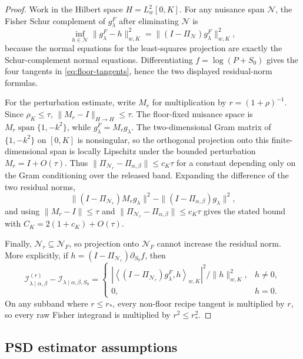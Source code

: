 \documentclass[11pt]{article}
\newcommand{\calI}{\mathcal I}
\newcommand{\calN}{\mathcal N}
\newcommand{\inner}[2]{\left\langle #1,#2\right\rangle}
\begin{document}
\begin{proof}
Work in the Hilbert space \(H=L^2_w[0,K]\). For any nuisance span \(\calN\), the Fisher Schur complement of \(g_\lambda^F\) after eliminating \(\calN\) is
\[
\inf_{h\in\calN}\|g_\lambda^F-h\|_{w,K}^2
=\|(I-\Pi_\calN)g_\lambda^F\|_{w,K}^2,
\]
because the normal equations for the least-squares projection are exactly the Schur-complement normal equations. Differentiating \(f=\log(P+S_0)\) gives the four tangents in \eqref{eq:floor-tangents}, hence the two displayed residual-norm formulas.

For the perturbation estimate, write \(M_r\) for multiplication by \(r=(1+\rho)^{-1}\). Since \(\rho_K\le\tau\), \(\|M_r-I\|_{H\to H}\le \tau\). The floor-fixed nuisance space is \(M_r\operatorname{span}\{1,-k^2\}\), while \(g_\lambda^F=M_rg_\lambda\). The two-dimensional Gram matrix of \(\{1,-k^2\}\) on \([0,K]\) is nonsingular, so the orthogonal projection onto this finite-dimensional span is locally Lipschitz under the bounded perturbation \(M_r=I+O(\tau)\). Thus \(\|\Pi_{\calN_r}-\Pi_{\alpha,\beta}\|\le c_K\tau\) for a constant depending only on the Gram conditioning over the released band. Expanding the difference of the two residual norms,
\[
\|(I-\Pi_{\calN_r})M_rg_\lambda\|^2-\|(I-\Pi_{\alpha,\beta})g_\lambda\|^2,
\]
and using \(\|M_r-I\|\le\tau\) and \(\|\Pi_{\calN_r}-\Pi_{\alpha,\beta}\|\le c_K\tau\) gives the stated bound with \(C_K=2(1+c_K)+O(\tau)\).

Finally, \(\calN_r\subseteq\calN_F\), so projection onto \(\calN_F\) cannot increase the residual norm. More explicitly, if \(h=(I-\Pi_{\calN_r})\partial_{S_0}f\), then
\[
\calI_{\lambda\mid\alpha,\beta}^{(r)}-\calI_{\lambda\mid\alpha,\beta,S_0}
=
\begin{cases}
|\inner{(I-\Pi_{\calN_r})g_\lambda^F}{h}_{w,K}|^2/\|h\|_{w,K}^2, & h\ne0,\\
0, & h=0.
\end{cases}
\]
On any subband where \(r\le r_*\), every non-floor recipe tangent is multiplied by \(r\), so every raw Fisher integrand is multiplied by \(r^2\le r_*^2\).
\end{proof}

\subsection{PSD estimator assumptions}
\end{document}
